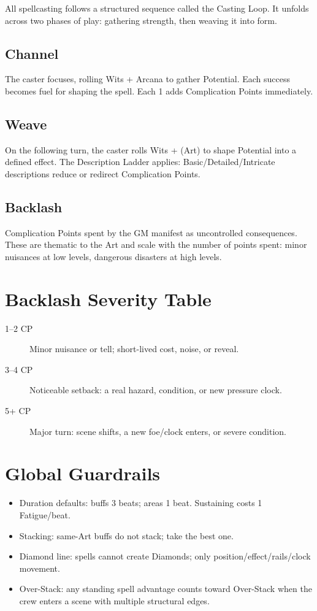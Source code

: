 All spellcasting follows a structured sequence called the Casting Loop. It unfolds across two phases of play: gathering strength, then weaving it into form.

\subsection{Channel}
The caster focuses, rolling Wits + Arcana to gather Potential. Each success becomes fuel for shaping the spell. Each 1 adds Complication Points immediately.

\subsection{Weave}
On the following turn, the caster rolls Wits + (Art) to shape Potential into a defined effect. The Description Ladder applies: Basic/Detailed/Intricate descriptions reduce or redirect Complication Points.

\subsection{Backlash}
Complication Points spent by the GM manifest as uncontrolled consequences. These are thematic to the Art and scale with the number of points spent: minor nuisances at low levels, dangerous disasters at high levels.

\section{Backlash Severity Table}

\begin{description}
\item[1--2 CP] Minor nuisance or tell; short-lived cost, noise, or reveal.
\item[3--4 CP] Noticeable setback: a real hazard, condition, or new pressure clock.
\item[5+ CP] Major turn: scene shifts, a new foe/clock enters, or severe condition.
\end{description}

\section{Global Guardrails}

\begin{itemize}
\item Duration defaults: buffs 3 beats; areas 1 beat. Sustaining costs 1 Fatigue/beat.
\item Stacking: same-Art buffs do not stack; take the best one.
\item Diamond line: spells cannot create Diamonds; only position/effect/rails/clock movement.
\item Over-Stack: any standing spell advantage counts toward Over-Stack when the crew enters a scene with multiple structural edges.
\end{itemize}


